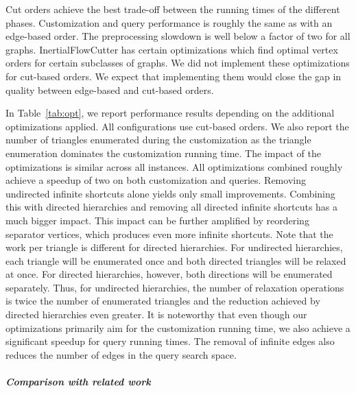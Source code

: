 \documentclass[a4paper, english, cleveref]{lipics-v2021}
\begin{document}
Cut orders achieve the best trade-off between the running times of the different phases.
Customization and query performance is roughly the same as with an edge-based order.
The preprocessing slowdown is well below a factor of two for all graphs.
InertialFlowCutter has certain optimizations which find optimal vertex orders for certain subclasses of graphs.
We did not implement these optimizations for cut-based orders.
We expect that implementing them would close the gap in quality between edge-based and cut-based orders.

In Table~\ref{tab:opt}, we report performance results depending on the additional optimizations applied.
All configurations use cut-based orders.
We also report the number of triangles enumerated during the customization as the triangle enumeration dominates the customization running time.
The impact of the optimizations is similar across all instances.
All optimizations combined roughly achieve a speedup of two on both customization and queries.
Removing undirected infinite shortcuts alone yields only small improvements.
Combining this with directed hierarchies and removing all directed infinite shortcuts has a much bigger impact.
This impact can be further amplified by reordering separator vertices, which produces even more infinite shortcuts.
Note that the work per triangle is different for directed hierarchies.
For undirected hierarchies, each triangle will be enumerated once and both directed triangles will be relaxed at once.
For directed hierarchies, however, both directions will be enumerated separately.
Thus, for undirected hierarchies, the number of relaxation operations is twice the number of enumerated triangles and the reduction achieved by directed hierarchies even greater.
It is noteworthy that even though our optimizations primarily aim for the customization running time, we also achieve a significant speedup for query running times.
The removal of infinite edges also reduces the number of edges in the query search space.

\subparagraph{Comparison with related work}
\end{document}
